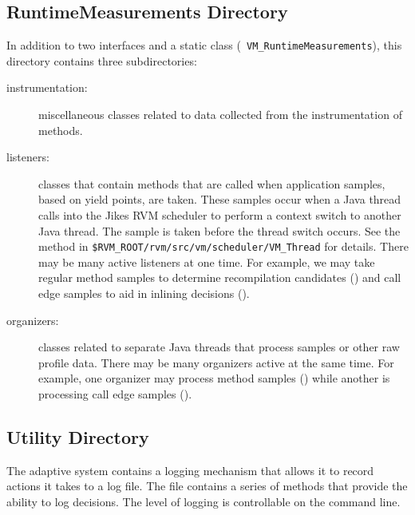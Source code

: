 \subsection{RuntimeMeasurements Directory}
In addition to two interfaces and a static class ({\tt
VM\_RuntimeMeasurements}),
this directory contains three subdirectories:
\begin{description}
\item[instrumentation:] miscellaneous classes related to
data collected from the instrumentation of methods.  

\item[listeners:] classes that contain methods that 
are called when application samples,
based on yield points, are taken.  These samples occur when a Java
thread calls into the Jikes RVM scheduler to perform a context switch
to another Java thread.  The sample is taken before the thread switch occurs.
See the 
 method in
{\tt \$RVM\_ROOT/rvm/src/vm/scheduler/VM\_Thread} for details.
There may be many active listeners at one
time.  For example, we may take regular method samples to determine
recompilation candidates () and call edge 
samples to aid in inlining decisions ().  

\item[organizers:]  classes related to separate Java threads that
process samples or other raw profile data.  There may be many
organizers active at the same time.
For example, one organizer may process method samples 
() while
another is processing 
call edge samples (). 
\end{description}

\JikesTMFooter

\subsection{Utility Directory}
The adaptive system contains a logging mechanism that allows it to
record actions it takes to a log file.  The file  
contains a series of methods that provide the ability to log
decisions.  The level of logging is controllable on the command line.

